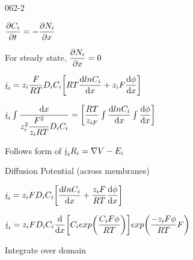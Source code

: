 \begin{mitframe}{062-2}
  	\begin{listone}
    		\item
    	\begin{listtwo}
    	\item $\dfrac{\partial\conc_{\state}}{\partial{t}}=-\dfrac{\partial\nummoles_{\state}}{\partial\disp}$
        \item For steady state, $\dfrac{\partial\nummoles_{\state}}{\partial\disp}=0$
        \item $\uline{\state}_{\state}=z_{\state}\dfrac{\force}{\gasconst\Temp}\elecdisplace_{\state}\conc_{\state}\bigg[\gasconst\Temp\dfrac{\mathrm{d}ln\conc_{\state}}{\mathrm{d}\disp}+z_{\state}\force\dfrac{\mathrm{d}\eleccoeff}{\mathrm{d}\disp}\bigg]$
        \item $\uline{\state}_{\state}\int\dfrac{\mathrm{d}\disp}{z_{\state}^2\dfrac{\force^2}{z_{\state}\gasconst\Temp}\elecdisplace_{\state}\conc_{\state}}=\bigg[\dfrac{\gasconst\Temp}{z_{\state\force}}\int\dfrac{\mathrm{d}ln\conc_{\state}}{\mathrm{d}\disp}\int\dfrac{\mathrm{d}\eleccoeff}{\mathrm{d}\disp}\bigg]$
        	\begin{listthree}
            	\item Follows form of $\uline{\state}_{\state}\gasconst_{\state}=\nabla\vol-\energy_{\state}$
            \end{listthree}
  		\end{listtwo}
  \item Diffusion Potential (across membranes)
  		\begin{listtwo}
			\item $\uline{\state}_{\state}=z_{\state}\force\elecdisplace_{\state}\conc_{\state}\bigg[\dfrac{\mathrm{d}ln\conc_{\state}}{\mathrm{d}\disp}+\dfrac{z_{\state}\force}{\gasconst\Temp}\dfrac{\mathrm{d}\eleccoeff}{\mathrm{d}\disp}\bigg]$
            \begin{listthree}
            	\item $\uline{\state}_{\state}=z_{\state}\force\elecdisplace_{\state}\conc_{\state}\dfrac{\mathrm{d}}{\mathrm{d}\disp}\bigg[
                \conc_{\state}exp\bigg(\dfrac{\conc_{\state}\force\eleccoeff}{\gasconst\Temp}\bigg)\bigg]exp\bigg(\dfrac{-z_{\state}\force\eleccoeff}{\gasconst\Temp}\force\bigg)$
                \item Integrate over domain
            \end{listthree}
\end{listtwo}
  \end{listone}

\end{mitframe}